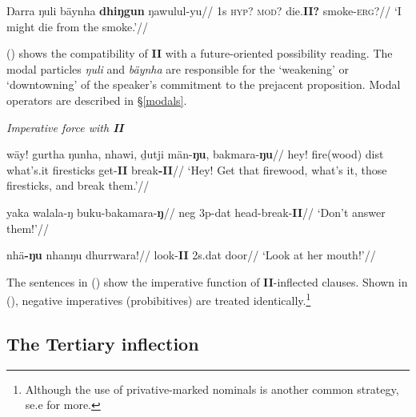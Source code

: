 \pex{}\begingl\gla Ŋarra ŋuli bäynha \textbf{dhiŋgun} ŋawulul-yu//
\glb 1s \textsc{hyp?} \textsc{mod?} die.\textbf{II?} smoke-\textsc{erg?}//
\glft`I might die from the smoke.'//\endgl\xe


() shows the compatibility of \textbf{II} with a future-oriented possibility reading. The modal particles \textit{ŋuli} and \textit{bäynha} are responsible for the `weakening' or `downtowning' of the speaker's commitment to the prejacent proposition. Modal operators are described in §\ref{modals}.


\pex\textit{Imperative force with \textbf{II}}

\a\begingl\gla wäy! gurtha ŋunha, nhawi, ḏutji män-\textbf{ŋu}, bakmara-\textbf{ŋu}//
\glb hey! fire(wood) \gls{dist} what's.it firesticks get-\textbf{II} break\textbf{-II}//
\glft`Hey! Get that firewood, what's it, those firesticks, and break them.'//\endgl




\a{}\begingl\gla yaka walala-ŋ buku-bakamara-\textbf{ŋ}//
\glb \gls{neg} 3p-\gls{dat} head-break-\textbf{II}//
\glft `Don't answer them!'//\endgl


\a\begingl\gla nhä\textbf{-ŋu} nhanŋu dhurrwara!//
\glb look-\textbf{II} 2s.\gls{dat} door//
\glft`Look at her mouth!'\trailingcitation[AW 20180731]//\endgl

\xe


The sentences in () show the imperative function of \textbf{II}-inflected clauses. Shown in (), negative imperatives (probibitives) are treated identically.\footnote{Although the use of privative-marked nominals is another common strategy, se.e \citet{Phillips2018a,Phillips2019} for more.}

\subsection{The Tertiary inflection}

